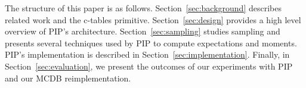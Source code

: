 The structure of this paper is as follows. Section~\ref{sec:background} describes related work and the c-tables primitive. Section~\ref{sec:design} provides a high level overview of PIP's architecture.  Section~\ref{sec:sampling} studies sampling and presents several techniques used by PIP to compute expectations and moments.  PIP's implementation is described in Section~\ref{sec:implementation}.  Finally, in Section~\ref{sec:evaluation}, we present the outcomes of our experiments with PIP and our MCDB reimplementation.

